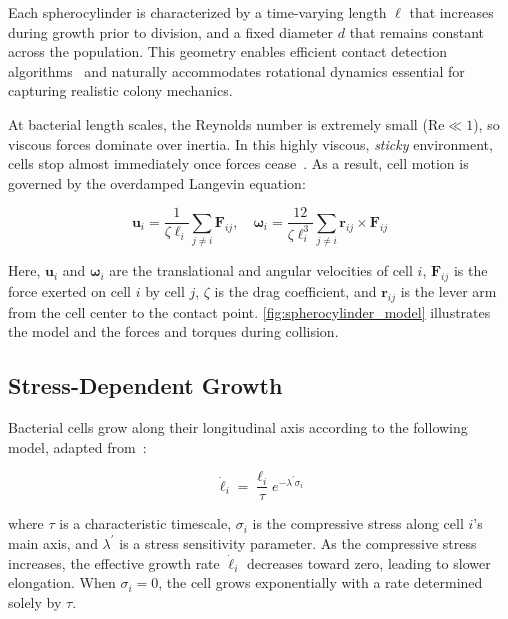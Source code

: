 \documentclass[conference]{IEEEtran}
\begin{document}
Each spherocylinder is characterized by a time-varying length $\ell$ that increases during growth prior to division, and a fixed diameter $d$ that remains constant across the population. This geometry enables efficient contact detection algorithms~\cite{GeometricTools} and naturally accommodates rotational dynamics essential for capturing realistic colony mechanics.

At bacterial length scales, the Reynolds number is extremely small ($\text{Re} \ll 1$), so viscous forces dominate over inertia. In this highly viscous, \textit{sticky} environment, cells stop almost immediately once forces cease~\cite{datta2024lifelowreynoldsnumber,Rudge2012}. As a result, cell motion is governed by the overdamped Langevin equation:

\begin{equation} \label{eq:overdamped_langevin}
    \mathbf{u}_i = \frac{1}{\zeta \ell_i} \sum_{j \neq i} \mathbf{F}_{ij}, \quad
    \boldsymbol{\omega}_i = \frac{12}{\zeta \ell_i^3} \sum_{j \neq i} \mathbf{r}_{ij} \times \mathbf{F}_{ij}
\end{equation}

Here, $\mathbf{u}_i$ and $\boldsymbol{\omega}_i$ are the translational and angular velocities of cell $i$, $\mathbf{F}_{ij}$ is the force exerted on cell $i$ by cell $j$, $\zeta$ is the drag coefficient, and $\mathbf{r}_{ij}$ is the lever arm from the cell center to the contact point. \autoref{fig:spherocylinder_model} illustrates the model and the forces and torques during collision.

\subsection{Stress-Dependent Growth}

Bacterial cells grow along their longitudinal axis according to the following model, adapted from~\cite{Weady2024SM}:

\begin{equation} \label{eq:growth}
    \dot{\ell}_i = \frac{\ell_i}{\tau} e^{-\lambda^{'} \sigma_i}
\end{equation}

where $\tau$ is a characteristic timescale, $\sigma_i$ is the compressive stress along cell $i$'s main axis, and $\lambda^{'}$ is a stress sensitivity parameter. As the compressive stress increases, the effective growth rate $\dot{\ell}_i$ decreases toward zero, leading to slower elongation. When $\sigma_i = 0$, the cell grows exponentially with a rate determined solely by $\tau$.
\end{document}
